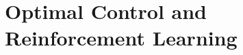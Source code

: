 \documentclass[oneside,hidelinks,12pt,letterpaper]{scrbook} %
\theoremstyle{remark}
\theoremstyle{coloredRemark}
\theoremstyle{coloredNote}
\begin{document}
%

\part{Optimal Control and Reinforcement Learning}
%
%





\appendix
%



\printindex
\end{document}
